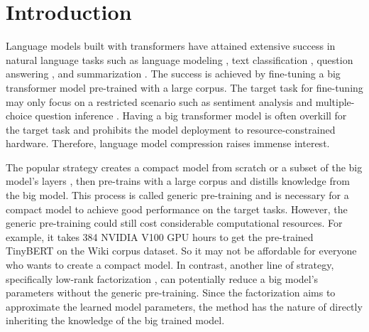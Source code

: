 \section{Introduction}

Language models built with transformers \citep{devlin2018bert} have attained extensive success in natural language tasks such as language modeling \citep{radford2018improving}, text classification \citep{wang2018glue}, question answering \citep{rajpurkar2016squad}, and summarization \citep{liu2019fine}. The success is achieved by fine-tuning a big transformer model pre-trained with a large corpus. The target task for fine-tuning may only focus on a restricted scenario such as sentiment analysis \citep{socher2013recursive} and multiple-choice question inference \citep{zellers2018swag}. Having a big transformer model is often overkill for the target task and prohibits the model deployment to resource-constrained hardware. Therefore, language model compression raises immense interest.

The popular strategy creates a compact model from scratch \citep{jiao2019tinybert} or a subset of the big model's layers \citep{sun2019patient,sanh2019distilbert}, then pre-trains with a large corpus and distills knowledge from the big model. This process is called generic pre-training \citep{wang2020minilm,sun2019patient,sanh2019distilbert} and is necessary for a compact model to achieve good performance on the target tasks. However, the generic pre-training could still cost considerable computational resources. For example, it takes 384 NVIDIA V100 GPU hours to get the pre-trained TinyBERT \citep{jiao2019tinybert} on the Wiki corpus dataset. So it may not be affordable for everyone who wants to create a compact model. In contrast, another line of strategy, specifically low-rank factorization \citep{golub1971singular,noach2020compressing}, can potentially reduce a big model's parameters without the generic pre-training. Since the factorization aims to approximate the learned model parameters, the method has the nature of directly inheriting the knowledge of the big trained model. 

